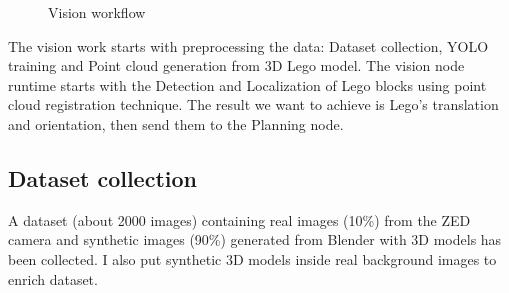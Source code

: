\documentclass{article}
\begin{document}
	\begin{figure}[H]
		\centering
		\caption{Vision workflow}
		\label{fig:design-vision}
	\end{figure}
	
	The vision work starts with preprocessing the data: Dataset collection, YOLO training and Point cloud generation from 3D Lego model. The vision node runtime starts with the Detection and Localization of Lego blocks using point cloud registration technique. The result we want to achieve is Lego's translation and orientation, then send them to the Planning node.
	
	\subsection{Dataset collection}
	A dataset (about 2000 images) containing real images (10\%) from the ZED camera and synthetic images (90\%) generated from Blender with 3D models has been collected. I also put synthetic 3D models inside real background images to enrich dataset.\\
	
\end{document}
